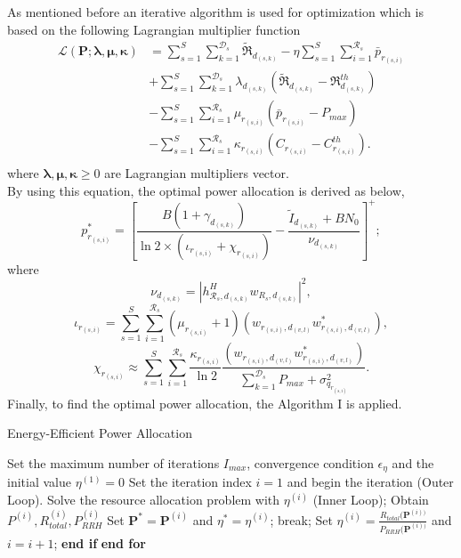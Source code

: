 \documentclass[conference,10pt,twocolumn,letter]{IEEEtran}
\begin{document}
As mentioned before an iterative algorithm is used for optimization which is based on the following Lagrangian multiplier function
\begin{equation}
\begin{split}
\mathcal{L}(\boldsymbol{P}; \boldsymbol{\lambda}, \boldsymbol{\mu}, \boldsymbol{ \kappa}) & = \sum\limits_{s=1}^{S} \sum\limits_{k=1}^{\mathcal{D}_s}\mathfrak{\tilde{R}}_{d_{(s,k)}} 
- \eta \sum\limits_{s=1}^{S} \sum\limits_{i=1}^{\mathcal{R}_s}\bar{p}_{r_{(s,i)}}\\
&+\sum\limits_{s=1}^{S} \sum\limits_{k=1}^{\mathcal{D}_s} \lambda_{d_{(s,k)}} (\mathfrak{\tilde{R}}_{d_{(s,k)}}-\mathfrak{R}_{d_{(s,k)}}^{th})\\
&- \sum\limits_{s=1}^{S} \sum\limits_{i=1}^{\mathcal{R}_s} \mu_{r_{(s,i)}} (\bar{p}_{r_{(s,i)}}-P_{max})\\
&- \sum\limits_{s=1}^{S} \sum\limits_{i=1}^{\mathcal{R}_s} \kappa_{r_{(s,i)}} (C_{r_{(s,i)}}-C_{r_{(s,i)}}^{th}).\\
\end{split}
\end{equation}
where $\boldsymbol{\lambda}, \boldsymbol{\mu}, \boldsymbol{\kappa} \geq 0$ are Lagrangian multipliers vector.\\
By using this equation, the optimal power allocation is derived as below,
\begin{equation}
p_{r_{(s,i)}}^* =[\frac{ B(1+\gamma_{d_{(s,k)}} )}{\ln2 \times (\iota_{r_{(s,i)}}+ \chi_{r_{(s,i)}})} -\frac{\tilde{I}_{d_{(s,k)}} + BN_0}{\nu_{d_{(s,k)}} }]^+;
\end{equation} 
where $$\nu_{d_{(s,k)}} =|h_{\mathcal{R}_s, d_{(s,k)}}^H w_{R_{s},d_{(s,k)}}|^2,$$
 $$\iota_{r_{(s,i)}}=\sum\limits_{s=1}^{S} \sum\limits_{i=1}^{\mathcal{R}_s} (\mu_{r_{(s,i)}}+1)(w_{r_{(s,i)},d_{(v,l)}} w_{r_{(s,i)},d_{(v,l)}}^*),$$
 $$\chi_{r_{(s,i)}} \approx  \sum\limits_{s=1}^{S} \sum\limits_{i=1}^{\mathcal{R}_s} \frac{\kappa_{r_{(s,i)}}}{\ln 2}\frac{(w_{r_{(s,i)},d_{(v,l)}} w_{r_{(s,i)},d_{(v,l)}}^*)}{ \sum\limits_{k=1}^{\mathcal{D}_s}P_{max}+\sigma_{q_{r_{(s,i)}}}^2}.$$
  Finally, to find the optimal power allocation, the Algorithm I is applied. 
\begin{algorithm}
\caption{Energy-Efficient Power Allocation}\label{alg}
\begin{algorithmic}[1]
\State Set the maximum number of iterations $I_{max}$, convergence condition $\epsilon_{\eta}$  and the initial value $\eta^{(1)} = 0$
\State Set the iteration index $i = 1$ and begin the iteration (Outer
Loop).
\State Solve the resource allocation problem with $\eta^{(i)}$ (Inner Loop);
\State Obtain $P^{(i)}, R_{total}^{(i)}, P_{RRH}^{(i)}$
\State Set $\boldsymbol{P}^*= \boldsymbol{P}^{(i)} $   and  $ \eta^{*} =\eta^{(i)} $;
\State break;
\Else
\State Set $\eta^{(i)}= \frac{R_{total}(\boldsymbol{P}^{(i))}}{P_{RRH}(\boldsymbol{P}^{(i))}}$ and $i= i+1$;
\EndIf 
\State \textbf{end if}
\EndFor 
\State \textbf{end for}
\end{algorithmic}
\end{algorithm}
\end{document}

